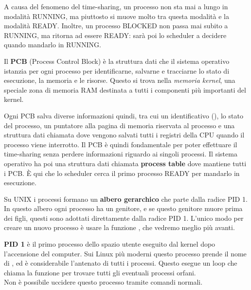\documentclass[11pt, a4paper, titlepage, oneside]{scrbook}
\begin{document}
A causa del fenomeno del time-sharing, un processo non sta mai a lungo in modalità RUNNING, ma piuttosto si muove molto tra questa modalità e la modalità READY. Inoltre, un processo BLOCKED non passa mai subito a RUNNING, ma ritorna ad essere READY: sarà poi lo scheduler a decidere quando mandarlo in RUNNING. 

\begin{Definizione}[PCB]
\label{def-PCB}
Il \textbf{PCB} (Process Control Block) è la struttura dati che il sistema operativo istanzia per ogni processo per identificarne, salvarne e tracciarne lo stato di esecuzione, la memoria e le risorse. Questo si trova nella \textit{memoria kernel}, una speciale zona di memoria RAM destinata a tutti i componenti più importanti del kernel.
\end{Definizione}

Ogni PCB salva diverse informazioni quindi, tra cui un identificativo (), lo stato del processo, un puntatore alla pagina di memoria riservata al processo e una struttura dati chiamata  dove vengono salvati tutti i registri della CPU quando il processo viene interrotto. Il PCB è quindi fondamentale per poter effettuare il time-sharing senza perdere informazioni riguardo ai singoli processi. Il sistema operativo ha poi una struttura dati chiamata \textbf{process table} dove mantiene tutti i PCB. È qui che lo scheduler cerca il primo processo READY per mandarlo in esecuzione. 

\begin{Definizione}
\label{def-gerarchia-processi}
Su UNIX i processi formano un \textbf{albero gerarchico} che parte dalla radice PID 1. In questo albero ogni processo ha un genitore, e se questo genitore muore prima dei figli, questi sono adottati direttamente dalla radice PID 1. L'unico modo per creare un nuovo processo è usare la funzione , che vedremo meglio più avanti.
\end{Definizione}

\begin{Definizione}[PID 1]
\label{def-PID-1}
\textbf{PID 1} è il primo processo dello spazio utente eseguito dal kernel dopo l'accensione del computer. Sui Linux più moderni questo processo prende il nome di , ed è considerabile l'antenato di tutti i processi. Questo esegue un loop che chiama la funzione  per trovare tutti gli eventuali processi orfani. \\
\NB Non è possibile uccidere questo processo tramite comandi normali. 
\end{Definizione}
\end{document}
